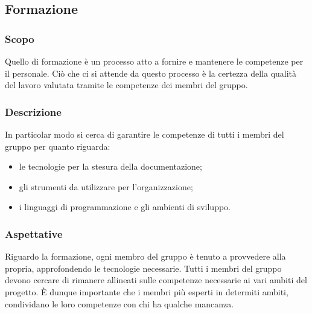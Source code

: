 \subsection{Formazione}
\subsubsection{Scopo}
Quello di formazione è un processo atto a fornire e mantenere le competenze per il personale. Ciò che ci si 
attende da questo processo è la certezza della qualità del lavoro valutata tramite le competenze dei membri 
del gruppo. 

\subsubsection{Descrizione}
In particolar modo si cerca di garantire le competenze di tutti i membri del gruppo per quanto 
riguarda:
\begin{itemize}
	\item le tecnologie per la stesura della documentazione;
	\item gli strumenti da utilizzare per l'organizzazione;
	\item i linguaggi di programmazione e gli ambienti di sviluppo.
\end{itemize}

\subsubsection{Aspettative}
Riguardo la formazione, ogni membro del gruppo è tenuto a provvedere alla propria, approfondendo le tecnologie 
necessarie. Tutti i membri del gruppo devono cercare di rimanere allineati sulle competenze necessarie ai vari 
ambiti del progetto. È dunque importante che i membri più esperti in determiti ambiti, condividano le loro 
competenze con chi ha qualche mancanza.

